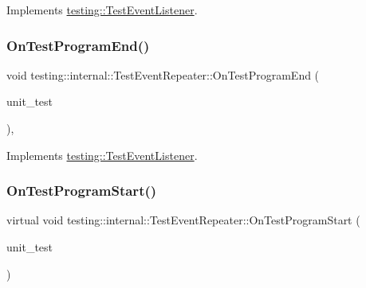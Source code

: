 Implements \mbox{\hyperlink{classtesting_1_1_test_event_listener_ad15b6246d94c268e233487a86463ef3d}{testing\+::\+Test\+Event\+Listener}}.

\mbox{\label{classtesting_1_1internal_1_1_test_event_repeater_a255378258ea0d14688303d4a6421746f}} 
\subsubsection{\texorpdfstring{OnTestProgramEnd()}{OnTestProgramEnd()}\hspace{0.1cm}{\footnotesize\ttfamily [3/3]}}
{\footnotesize\ttfamily void testing\+::internal\+::\+Test\+Event\+Repeater\+::\+On\+Test\+Program\+End (\begin{DoxyParamCaption}\item[{const \mbox{\hyperlink{classtesting_1_1_unit_test}{Unit\+Test}} \&}]{unit\+\_\+test }\end{DoxyParamCaption})\hspace{0.3cm}{\ttfamily [override]}, {\ttfamily [virtual]}}



Implements \mbox{\hyperlink{classtesting_1_1_test_event_listener_ad15b6246d94c268e233487a86463ef3d}{testing\+::\+Test\+Event\+Listener}}.

\mbox{\label{classtesting_1_1internal_1_1_test_event_repeater_a15ee2ff051063088d3a89a266d5ffcc4}} 
\subsubsection{\texorpdfstring{OnTestProgramStart()}{OnTestProgramStart()}\hspace{0.1cm}{\footnotesize\ttfamily [1/3]}}
{\footnotesize\ttfamily virtual void testing\+::internal\+::\+Test\+Event\+Repeater\+::\+On\+Test\+Program\+Start (\begin{DoxyParamCaption}\item[{const \mbox{\hyperlink{classtesting_1_1_unit_test}{Unit\+Test}} \&}]{unit\+\_\+test }\end{DoxyParamCaption})\hspace{0.3cm}{\ttfamily [virtual]}}



